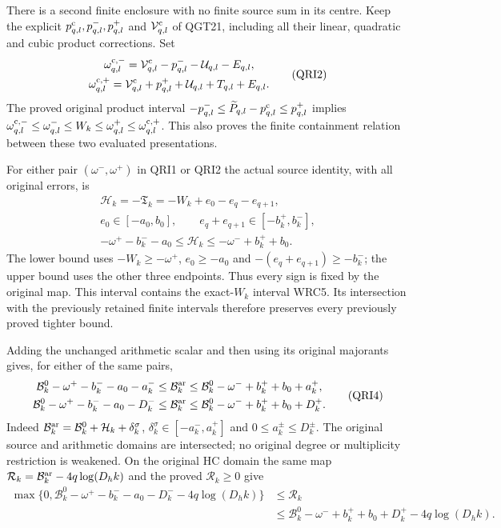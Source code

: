 \documentclass[11pt,a4paper]{article}
\begin{document}
There is a second finite enclosure with no finite source sum in
its centre. Keep the explicit $p^{\rm c}_{q,l},p^-_{q,l},p^+_{q,l}$
and $\mathcal V^{\rm c}_{q,l}$ of QGT21, including all their
linear, quadratic and cubic product corrections. Set
\[
\begin{gathered}
 \omega_{q,l}^{\rm c,-}=\mathcal V^{\rm c}_{q,l}
                    -p^-_{q,l}-\mathcal U_{q,l}-E_{q,l},\\
 \omega_{q,l}^{\rm c,+}=\mathcal V^{\rm c}_{q,l}
                    +p^+_{q,l}+\mathcal U_{q,l}+T_{q,l}+E_{q,l}.
\end{gathered}\tag{QRI2}
\]
The proved original product interval
$-p^-_{q,l}\le\widetilde P_{q,l}-p^{\rm c}_{q,l}\le p^+_{q,l}$
implies
$\omega_{q,l}^{\rm c,-}\le\omega_{q,l}^-\le W_k
 \le\omega_{q,l}^+\le\omega_{q,l}^{\rm c,+}$.
This also proves the finite containment relation between these
two evaluated presentations.

For either pair $(\omega^-,\omega^+)$ in QRI1 or QRI2 the actual
source identity, with all original errors, is
\[
\begin{gathered}
 \mathcal H_k=-\mathfrak T_k=-W_k+e_0-e_q-e_{q+1},\\
 e_0\in[-a_0,b_0],\qquad
 e_q+e_{q+1}\in[-b_k^+,b_k^-],\\
 -\omega^+-b_k^--a_0\le\mathcal H_k
                            \le-\omega^-+b_k^++b_0.
\end{gathered}\tag{QRI3}
\]
The lower bound uses $-W_k\ge-\omega^+$, $e_0\ge-a_0$ and
$-(e_q+e_{q+1})\ge-b_k^-$; the upper bound uses the other three
endpoints. Thus every sign is fixed by the original map. This
interval contains the exact-$W_k$ interval WRC5. Its intersection
with the previously retained finite intervals therefore preserves
every previously proved tighter bound.

Adding the unchanged arithmetic scalar and then using its original
majorants gives, for either of the same pairs,
\[
\begin{split}
 \mathcal B_k^0-\omega^+-b_k^--a_0-a_k^-
 &\le\mathcal B_k^{\rm ar}
 \le\mathcal B_k^0-\omega^-+b_k^++b_0+a_k^+,\\
 \mathcal B_k^0-\omega^+-b_k^--a_0-D_k^-
 &\le\mathcal B_k^{\rm ar}
 \le\mathcal B_k^0-\omega^-+b_k^++b_0+D_k^+.
\end{split}\tag{QRI4}
\]
Indeed $\mathcal B_k^{\rm ar}=\mathcal B_k^0+\mathcal H_k
+\delta_k^\sigma$, $\delta_k^\sigma\in[-a_k^-,a_k^+]$ and
$0\le a_k^\pm\le D_k^\pm$. The original source and arithmetic
domains are intersected; no original degree or multiplicity
restriction is weakened. On the original HC domain the same map
$\mathcal R_k=\mathcal B_k^{\rm ar}-4q\log(D_hk)$ and the
proved $\mathcal R_k\ge0$ give
\[
\begin{split}
 \max\{0,\mathcal B_k^0-\omega^+-b_k^--a_0-D_k^-
                              -4q\log(D_hk)\}
 &\le\mathcal R_k\\
 &\le\mathcal B_k^0-\omega^-+b_k^++b_0+D_k^+
                              -4q\log(D_hk).
\end{split}\tag{QRI5}
\]
\end{document}
